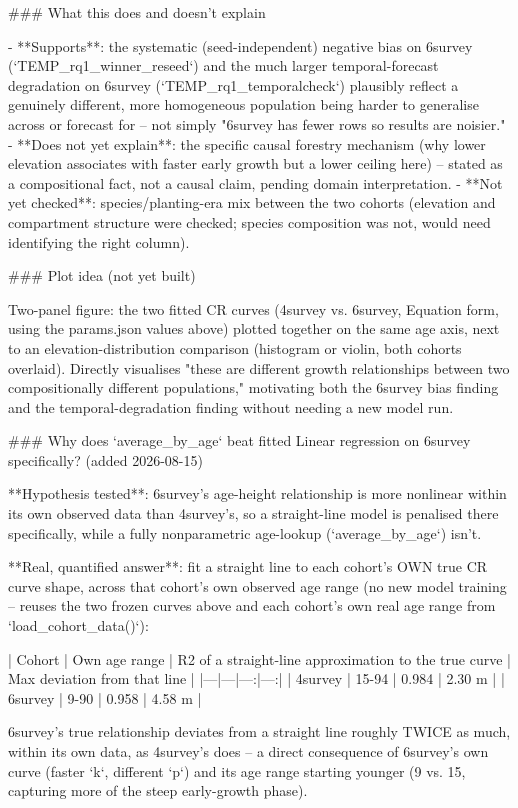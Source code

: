 ### What this does and doesn't explain

- **Supports**: the systematic (seed-independent) negative bias on 6survey (`TEMP_rq1_winner_reseed`)
  and the much larger temporal-forecast degradation on 6survey (`TEMP_rq1_temporalcheck`) plausibly
  reflect a genuinely different, more homogeneous population being harder to generalise across or
  forecast for -- not simply "6survey has fewer rows so results are noisier."
- **Does not yet explain**: the specific causal forestry mechanism (why lower elevation associates
  with faster early growth but a lower ceiling here) -- stated as a compositional fact, not a
  causal claim, pending domain interpretation.
- **Not yet checked**: species/planting-era mix between the two cohorts (elevation and compartment
  structure were checked; species composition was not, would need identifying the right column).

### Plot idea (not yet built)

Two-panel figure: the two fitted CR curves (4survey vs. 6survey, Equation form, using the
params.json values above) plotted together on the same age axis, next to an elevation-distribution
comparison (histogram or violin, both cohorts overlaid). Directly visualises "these are different
growth relationships between two compositionally different populations," motivating both the
6survey bias finding and the temporal-degradation finding without needing a new model run.

### Why does `average_by_age` beat fitted Linear regression on 6survey specifically? (added 2026-08-15)

**Hypothesis tested**: 6survey's age-height relationship is more nonlinear within its own observed
data than 4survey's, so a straight-line model is penalised there specifically, while a fully
nonparametric age-lookup (`average_by_age`) isn't.

**Real, quantified answer**: fit a straight line to each cohort's OWN true CR curve shape, across
that cohort's own observed age range (no new model training -- reuses the two frozen curves above
and each cohort's own real age range from `load_cohort_data()`):

| Cohort | Own age range | R2 of a straight-line approximation to the true curve | Max deviation from that line |
|---|---|---:|---:|
| 4survey | 15-94 | 0.984 | 2.30 m |
| 6survey | 9-90 | 0.958 | 4.58 m |

6survey's true relationship deviates from a straight line roughly TWICE as much, within its own
data, as 4survey's does -- a direct consequence of 6survey's own curve (faster `k`, different `p`)
and its age range starting younger (9 vs. 15, capturing more of the steep early-growth phase).

